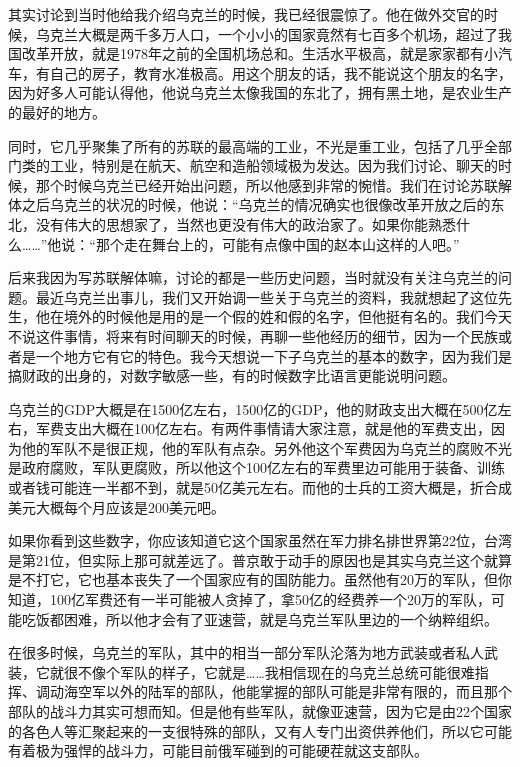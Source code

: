 \documentclass[UTF8, 12pt, a4paper]{ctexrep}
\begin{document}
其实讨论到当时他给我介绍乌克兰的时候，我已经很震惊了。他在做外交官的时候，乌克兰大概是两千多万人口，一个小小的国家竟然有七百多个机场，超过了我国改革开放，就是1978年之前的全国机场总和。生活水平极高，就是家家都有小汽车，有自己的房子，教育水准极高。用这个朋友的话，我不能说这个朋友的名字，因为好多人可能认得他，他说乌克兰太像我国的东北了，拥有黑土地，是农业生产的最好的地方。

同时，它几乎聚集了所有的苏联的最高端的工业，不光是重工业，包括了几乎全部门类的工业，特别是在航天、航空和造船领域极为发达。因为我们讨论、聊天的时候，那个时候乌克兰已经开始出问题，所以他感到非常的惋惜。我们在讨论苏联解体之后乌克兰的状况的时候，他说：“乌克兰的情况确实也很像改革开放之后的东北，没有伟大的思想家了，当然也更没有伟大的政治家了。如果你能熟悉什么……”他说：“那个走在舞台上的，可能有点像中国的赵本山这样的人吧。”

后来我因为写苏联解体嘛，讨论的都是一些历史问题，当时就没有关注乌克兰的问题。最近乌克兰出事儿，我们又开始调一些关于乌克兰的资料，我就想起了这位先生，他在境外的时候他是用的是一个假的姓和假的名字，但他挺有名的。我们今天不说这件事情，将来有时间聊天的时候，再聊一些他经历的细节，因为一个民族或者是一个地方它有它的特色。我今天想说一下子乌克兰的基本的数字，因为我们是搞财政的出身的，对数字敏感一些，有的时候数字比语言更能说明问题。

乌克兰的GDP大概是在1500亿左右，1500亿的GDP，他的财政支出大概在500亿左右，军费支出大概在100亿左右。有两件事情请大家注意，就是他的军费支出，因为他的军队不是很正规，他的军队有点杂。另外他这个军费因为乌克兰的腐败不光是政府腐败，军队更腐败，所以他这个100亿左右的军费里边可能用于装备、训练或者钱可能连一半都不到，就是50亿美元左右。而他的士兵的工资大概是，折合成美元大概每个月应该是200美元吧。

如果你看到这些数字，你应该知道它这个国家虽然在军力排名排世界第22位，台湾是第21位，但实际上那可就差远了。普京敢于动手的原因也是其实乌克兰这个就算是不打它，它也基本丧失了一个国家应有的国防能力。虽然他有20万的军队，但你知道，100亿军费还有一半可能被人贪掉了，拿50亿的经费养一个20万的军队，可能吃饭都困难，所以他才会有了亚速营，就是乌克兰军队里边的一个纳粹组织。

在很多时候，乌克兰的军队，其中的相当一部分军队沦落为地方武装或者私人武装，它就很不像个军队的样子，它就是……我相信现在的乌克兰总统可能很难指挥、调动海空军以外的陆军的部队，他能掌握的部队可能是非常有限的，而且那个部队的战斗力其实可想而知。但是他有些军队，就像亚速营，因为它是由22个国家的各色人等汇聚起来的一支很特殊的部队，又有人专门出资供养他们，所以它可能有着极为强悍的战斗力，可能目前俄军碰到的可能硬茬就这支部队。
\end{document}
